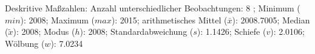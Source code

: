                     \begin{noten}
                	    \note{} Deskritive Maßzahlen:
                	    Anzahl unterschiedlicher Beobachtungen: 8%
                	    ; 
                	      Minimum ($min$): 2008; 
                	      Maximum ($max$): 2015; 
                	      arithmetisches Mittel ($\bar{x}$): \num[round-mode=places,round-precision=2]{2008,7005}; 
                	      Median ($\tilde{x}$): 2008; 
                	      Modus ($h$): 2008; 
                	      Standardabweichung ($s$): \num[round-mode=places,round-precision=2]{1,1426}; 
                	      Schiefe ($v$): \num[round-mode=places,round-precision=2]{2,0106}; 
                	      Wölbung ($w$): \num[round-mode=places,round-precision=2]{7,0234}
                     \end{noten}


